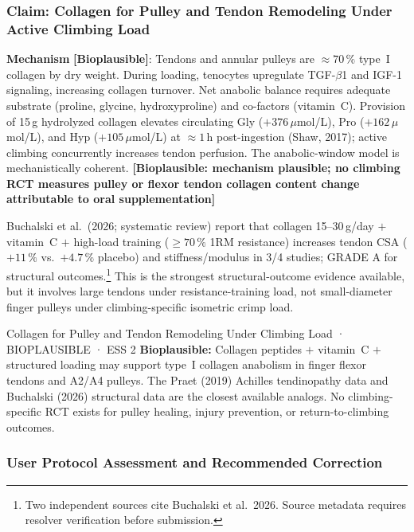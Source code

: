 \subsubsection{Claim: Collagen for Pulley and Tendon Remodeling Under Active Climbing Load}

\textbf{Mechanism} \textbf{[Bioplausible]}: Tendons and annular pulleys are ${\approx}70\,\%$ type~I collagen by dry weight. During loading, tenocytes upregulate TGF-$\beta$1 and IGF-1 signaling, increasing collagen turnover. Net anabolic balance requires adequate substrate (proline, glycine, hydroxyproline) and co-factors (vitamin~C). Provision of 15\,g hydrolyzed collagen elevates circulating Gly ($+376$\,$\mu$mol/L), Pro ($+162$\,$\mu$mol/L), and Hyp ($+105$\,$\mu$mol/L) at ${\approx}1$\,h post-ingestion (Shaw, 2017); active climbing concurrently increases tendon perfusion. The anabolic-window model is mechanistically coherent. \textbf{[Bioplausible: mechanism plausible; no climbing RCT measures pulley or flexor tendon collagen content change attributable to oral supplementation]}

Buchalski et al.\ (2026; systematic review) report that collagen 15--30\,g/day $+$ vitamin~C $+$ high-load training (${\geq}70\,\%$ 1RM resistance) increases tendon CSA ($+11\,\%$ vs.\ $+4.7\,\%$ placebo) and stiffness/modulus in 3/4 studies; GRADE A for structural outcomes.\footnote{Two independent sources cite Buchalski et al.\ 2026. Source metadata requires resolver verification before submission.} This is the strongest structural-outcome evidence available, but it involves large tendons under resistance-training load, not small-diameter finger pulleys under climbing-specific isometric crimp load.

\begin{bioplausbox}{Collagen for Pulley and Tendon Remodeling Under Climbing Load · BIOPLAUSIBLE · ESS 2}
\textbf{Bioplausible:} Collagen peptides $+$ vitamin~C $+$ structured loading may support type~I collagen anabolism in finger flexor tendons and A2/A4 pulleys. The Praet (2019) Achilles tendinopathy data and Buchalski (2026) structural data are the closest available analogs. No climbing-specific RCT exists for pulley healing, injury prevention, or return-to-climbing outcomes.
\end{bioplausbox}

\subsubsection{User Protocol Assessment and Recommended Correction}

